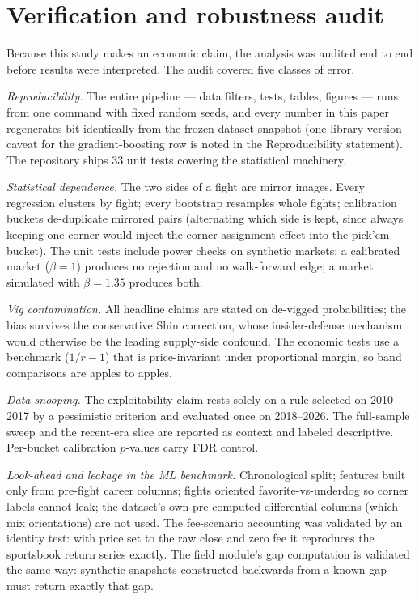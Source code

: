 \documentclass[11pt]{article}
\newcommand{\devig}{de-vigged}
\begin{document}
\section{Verification and robustness audit}

Because this study makes an economic claim, the analysis was audited end to end before results
were interpreted. The audit covered five classes of error.

\emph{Reproducibility.} The entire pipeline --- data filters, tests, tables, figures --- runs
from one command with fixed random seeds, and every number in this paper regenerates
bit-identically from the frozen dataset snapshot (one library-version caveat for the
gradient-boosting row is noted in the Reproducibility statement). The repository ships 33 unit
tests covering the statistical machinery.

\emph{Statistical dependence.} The two sides of a fight are mirror images. Every regression
clusters by fight; every bootstrap resamples whole fights; calibration buckets de-duplicate
mirrored pairs (alternating which side is kept, since always keeping one corner would inject the
corner-assignment effect into the pick'em bucket). The unit tests include power checks on
synthetic markets: a calibrated market ($\beta = 1$) produces no rejection and no walk-forward
edge; a market simulated with $\beta = 1.35$ produces both.

\emph{Vig contamination.} All headline claims are stated on \devig{} probabilities; the bias
survives the conservative Shin correction, whose insider-defense mechanism would otherwise be the
leading supply-side confound. The economic tests use a benchmark ($1/r - 1$) that is
price-invariant under proportional margin, so band comparisons are apples to apples.

\emph{Data snooping.} The exploitability claim rests solely on a rule selected on 2010--2017 by a
pessimistic criterion and evaluated once on 2018--2026. The full-sample sweep and the recent-era
slice are reported as context and labeled descriptive. Per-bucket calibration $p$-values carry
FDR control.

\emph{Look-ahead and leakage in the ML benchmark.} Chronological split; features built only from
pre-fight career columns; fights oriented favorite-vs-underdog so corner labels cannot leak; the
dataset's own pre-computed differential columns (which mix orientations) are not used. The
fee-scenario accounting was validated by an identity test: with price set to the raw close and
zero fee it reproduces the sportsbook return series exactly. The field module's gap computation
is validated the same way: synthetic snapshots constructed backwards from a known gap must return
exactly that gap.
\end{document}

